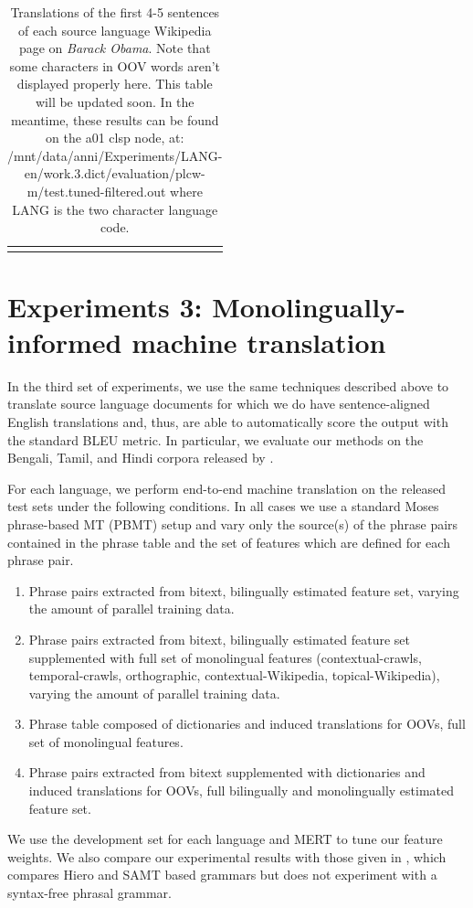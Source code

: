 \documentclass[11pt]{article}
\begin{document}
\begin{center}
\begin{longtable}{|p{1.5cm}|p{13cm}|}
\hline
\caption{Translations of the first 4-5 sentences of each source language Wikipedia page on {\it Barack Obama}. Note that some characters in OOV words aren't displayed properly here. This table will be updated soon. In the meantime, these results can be found on the a01 clsp node, at: /mnt/data/anni/Experiments/LANG-en/work.3.dict/evaluation/plcw-m/test.tuned-filtered.out where LANG is the two character language code.} \label{table:qualtrans}  \\
\end{longtable}
\end{center}

\twocolumn

\section{Experiments 3: Monolingually-informed machine translation}

In the third set of experiments, we use the same techniques described above to translate source language documents for which we do have sentence-aligned English translations and, thus, are able to automatically score the output with the standard BLEU metric. In particular, we evaluate our methods on the Bengali, Tamil, and Hindi corpora released by .

For each language, we perform end-to-end machine translation on the released test sets under the following conditions. In all cases we use a standard Moses phrase-based MT (PBMT) setup and vary only the source(s) of the phrase pairs contained in the phrase table and the set of features which are defined for each phrase pair.
\begin{enumerate}
\item{Phrase pairs extracted from bitext, bilingually estimated feature set, varying the amount of parallel training data.}
\item{Phrase pairs extracted from bitext, bilingually estimated feature set supplemented with full set of monolingual features (contextual-crawls, temporal-crawls, orthographic, contextual-Wikipedia, topical-Wikipedia), varying the amount of parallel training data. }
\item{Phrase table composed of dictionaries and induced translations for OOVs, full set of monolingual features.}
\item{Phrase pairs extracted from bitext supplemented with dictionaries and induced translations for OOVs, full bilingually and monolingually estimated feature set.}
\end{enumerate}
We use the development set for each language and MERT to tune our feature weights. We also compare our experimental results with those given in , which compares Hiero and SAMT based grammars but does not experiment with a syntax-free phrasal grammar. 
\end{document}
